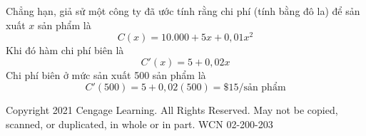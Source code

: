 Chẳng hạn, giả sử một công ty đã ước tính rằng chi phí (tính bằng đô la) để sản xuất $x$ sản phẩm là
\[
C(x) = 10.000 + 5x + 0{,}01x^2
\]
Khi đó hàm chi phí biên là
\[
C'(x) = 5 + 0{,}02x
\]
Chi phí biên ở mức sản xuất 500 sản phẩm là
\[
C'(500) = 5 + 0{,}02(500) = \$15/\text{sản phẩm}
\]

\vfill

\begin{flushleft}
{\fontsize{5.5}{6.5}\selectfont\color{gray!70}
Copyright 2021 Cengage Learning. All Rights Reserved. May not be copied, scanned, or duplicated, in whole or in part. WCN 02-200-203
\par}
\end{flushleft}
